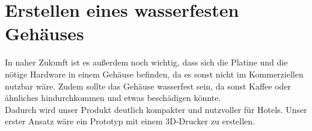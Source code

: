 \section{Erstellen eines wasserfesten Gehäuses}
In naher Zukunft ist es außerdem noch wichtig, dass sich die Platine und die nötige Hardware in einem Gehäuse befinden, da es sonst nicht im Kommerziellen nutzbar wäre. Zudem sollte das Gehäuse wasserfest sein, da sonst Kaffee oder ähnliches hindurchkommen und etwas beschädigen könnte.\\

Dadurch wird unser Produkt deutlich kompakter und nutzvoller für Hotels. Unser erster Ansatz wäre ein Prototyp mit einem 3D-Drucker zu erstellen. 


\nocite{online:getting-started-load-cells}
\nocite{doc:getting-started}
\nocite{wiki:load-cell}
\nocite{wiki:Force-sensing-resistor}
\nocite{wiki:Piezoelectric-sensor}
\nocite{online:ic880a-gateway}
\nocite{online:datalink}
\nocite{online:lorawan-security}
\nocite{excel:lorawan-airtime}
\nocite{picture:spreading-factor}
\nocite{picture:lorawan}
\nocite{doc:rn2483}
\nocite{doc:lora-documentation}

\printbibliography
